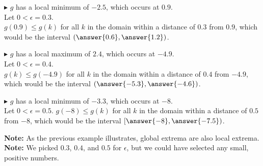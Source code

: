 \documentclass{ximera}
\begin{document}
$\blacktriangleright$ $g$ has a local minimum of $-2.5$, which occurs at $0.9$. \\


Let $0 < \epsilon = 0.3$.  \\
$g(0.9) \leq g(k)$ for all $k$ in the domain within a distance of $0.3$ from $0.9$, which would be the interval $\left(\answer{0.6}, \answer{1.2}\right)$.




$\blacktriangleright$ $g$ has a local maximum of $2.4$, which occurs at $-4.9$. \\






Let $0 < \epsilon = 0.4$.  \\
$g(k) \leq g(-4.9)$ for all $k$ in the domain within a distance of $0.4$ from $-4.9$, which would be the interval $\left(\answer{-5.3}, \answer{-4.6}\right)$.




$\blacktriangleright$ $g$ has a local minimum of $-3.3$, which occurs at $-8$. \\





Let $0 < \epsilon = 0.5$.  $g(-8) \leq g(k)$ for all $k$ in the domain within a distance of $0.5$ from $-8$, which would be the interval $\left[\answer{-8}, \answer{-7.5}\right)$.





\textbf{Note:} As the previous example illustrates, global extrema are also local extrema. \\
\textbf{Note:} We picked $0.3$, $0.4$, and $0.5$ for $\epsilon$, but we could have selected any small, positive numbers.
\end{document}
